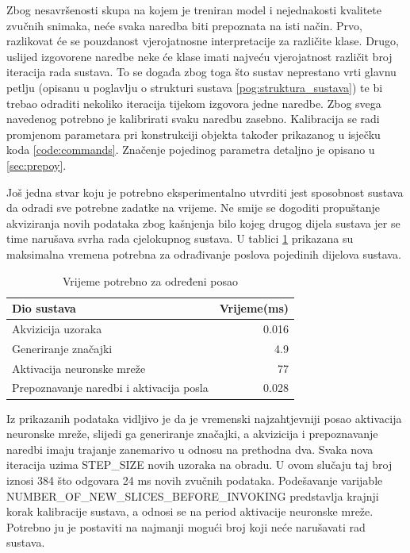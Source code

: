 Zbog nesavršenosti skupa na kojem je treniran model i nejednakosti kvalitete
zvučnih snimaka, neće svaka naredba biti prepoznata na isti način. Prvo, razlikovat će
se pouzdanost vjerojatnosne interpretacije za različite klase. Drugo, uslijed izgovorene
naredbe neke će klase imati najveću vjerojatnost različit broj iteracija rada sustava.
To se događa zbog toga što sustav neprestano vrti glavnu petlju (opisanu u poglavlju
o strukturi sustava \ref{pog:struktura_sustava}) te bi trebao odraditi nekoliko iteracija tijekom izgovora
jedne naredbe. Zbog svega navedenog potrebno je kalibrirati svaku naredbu zasebno.
Kalibracija se radi promjenom parametara pri konstrukciji objekta također prikazanog 
u isječku koda \ref{code:commands}. Značenje pojedinog  parametra detaljno je opisano u 
\ref{sec:prepoy}. 

Još jedna stvar koju je potrebno eksperimentalno utvrditi jest sposobnost sustava da
odradi sve potrebne zadatke na vrijeme. Ne smije se dogoditi propuštanje akviziranja
novih podataka zbog kašnjenja bilo kojeg drugog dijela sustava jer se time narušava
svrha rada cjelokupnog sustava. U tablici \ref{tab:rts} prikazana su maksimalna
vremena potrebna za odrađivanje poslova pojedinih dijelova sustava. 

\begin{table}[htb]
    \centering
    \begin{tabular}{|l|r|}
        \hline
        \textbf{Dio sustava} & \textbf{Vrijeme(ms)} \\ \hline
        Akvizicija uzoraka & 0.016\\ \hline
        Generiranje značajki & 4.9 \\ \hline
        Aktivacija neuronske mreže & 77 \\ \hline
        Prepoznavanje naredbi i aktivacija posla & 0.028 \\ \hline
    \end{tabular}
    \caption{Vrijeme potrebno za određeni posao}
    \label{tab:rts}
\end{table}

Iz prikazanih podataka
vidljivo je da je vremenski najzahtjevniji posao aktivacija neuronske mreže, slijedi ga 
generiranje značajki, a akvizicija i prepoznavanje naredbi imaju trajanje zanemarivo u odnosu
na prethodna dva. Svaka nova iteracija uzima STEP\_SIZE novih uzoraka na obradu. U ovom slučaju
taj broj iznosi 384 što odgovara 24 ms novih zvučnih podataka. Podešavanje varijable
NUMBER\_OF\_NEW\_SLICES\_BEFORE\_INVOKING predstavlja krajnji korak kalibracije sustava, a odnosi
se na period aktivacije neuronske mreže.
Potrebno ju je postaviti na najmanji mogući broj koji neće narušavati rad sustava. 

